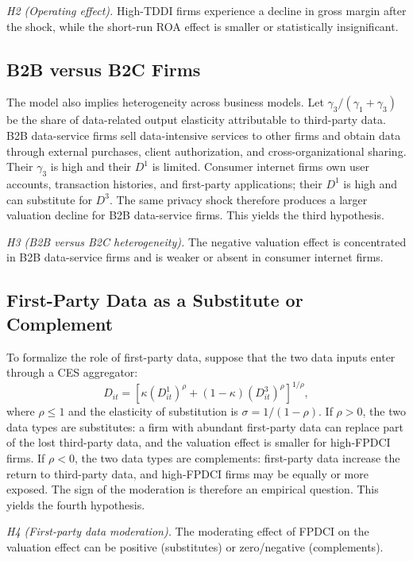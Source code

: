\textit{H2 (Operating effect).} High-TDDI firms experience a decline in gross margin after the shock, while the short-run ROA effect is smaller or statistically insignificant.

\subsection{B2B versus B2C Firms}

The model also implies heterogeneity across business models. Let $\gamma_3/(\gamma_1+\gamma_3)$ be the share of data-related output elasticity attributable to third-party data. B2B data-service firms sell data-intensive services to other firms and obtain data through external purchases, client authorization, and cross-organizational sharing. Their $\gamma_3$ is high and their $D^{1}$ is limited. Consumer internet firms own user accounts, transaction histories, and first-party applications; their $D^{1}$ is high and can substitute for $D^{3}$. The same privacy shock therefore produces a larger valuation decline for B2B data-service firms. This yields the third hypothesis.

\textit{H3 (B2B versus B2C heterogeneity).} The negative valuation effect is concentrated in B2B data-service firms and is weaker or absent in consumer internet firms.

\subsection{First-Party Data as a Substitute or Complement}

To formalize the role of first-party data, suppose that the two data inputs enter through a CES aggregator:
\begin{equation}
D_{it}=\left[\kappa\left(D^{1}_{it}\right)^{\rho}+(1-\kappa)\left(D^{3}_{it}\right)^{\rho}\right]^{1/\rho},
\label{eq:ces}
\end{equation}
where $\rho\leq1$ and the elasticity of substitution is $\sigma=1/(1-\rho)$. If $\rho>0$, the two data types are substitutes: a firm with abundant first-party data can replace part of the lost third-party data, and the valuation effect is smaller for high-FPDCI firms. If $\rho<0$, the two data types are complements: first-party data increase the return to third-party data, and high-FPDCI firms may be equally or more exposed. The sign of the moderation is therefore an empirical question. This yields the fourth hypothesis.

\textit{H4 (First-party data moderation).} The moderating effect of FPDCI on the valuation effect can be positive (substitutes) or zero/negative (complements).


